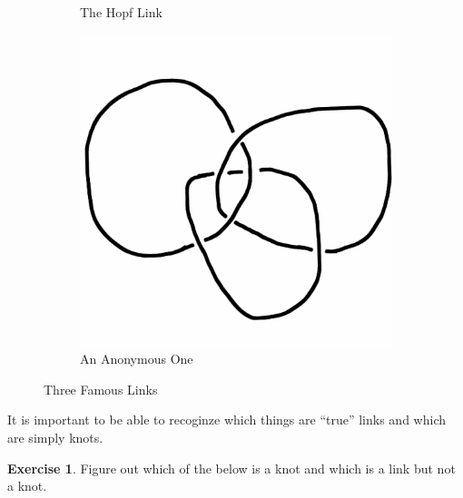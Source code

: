 \documentclass[12pt,letterpaper]{article}
\theoremstyle{definition}
\newtheorem{exercise}[question]{Exercise}
\begin{document}
\begin{figure}[h]
\begin{subfigure}{.3\textwidth}
        \caption{The Hopf Link}
    \end{subfigure}
    \quad
    \begin{subfigure}{.3\textwidth}
        \centering
        \includegraphics[width=\textwidth]{rgp10pics/tj3.png}
        \caption{An Anonymous One}
    \end{subfigure}
    \caption{Three Famous Links}
\end{figure}

\clearpage

It is important to be able to recoginze which things are ``true'' links and which are simply knots.

\begin{exercise}
Figure out which of the below is a knot and which is a link but not a knot.
\end{exercise}
\end{document}

